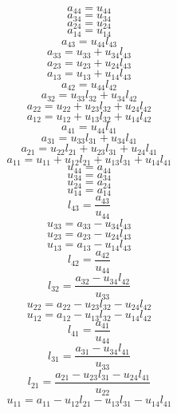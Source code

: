 \documentclass[10pt,a4paper,dvipdfmx]{article}
\begin{document}
\begin{multicols}{2}
$$ a_{{4}{4}} = u_{{4}{4}} $$
$$ a_{{3}{4}} = u_{{3}{4}} $$
$$ a_{{2}{4}} = u_{{2}{4}} $$
$$ a_{{1}{4}} = u_{{1}{4}} $$
$$ a_{{4}{3}} = u_{{4}{4}} l_{{4}{3}} $$
$$ a_{{3}{3}} = u_{{3}{3}} + u_{{3}{4}} l_{{4}{3}} $$
$$ a_{{2}{3}} = u_{{2}{3}} + u_{{2}{4}} l_{{4}{3}} $$
$$ a_{{1}{3}} = u_{{1}{3}} + u_{{1}{4}} l_{{4}{3}} $$
$$ a_{{4}{2}} = u_{{4}{4}} l_{{4}{2}} $$
$$ a_{{3}{2}} = u_{{3}{3}} l_{{3}{2}} + u_{{3}{4}} l_{{4}{2}} $$
$$ a_{{2}{2}} = u_{{2}{2}} + u_{{2}{3}} l_{{3}{2}} + u_{{2}{4}} l_{{4}{2}} $$
$$ a_{{1}{2}} = u_{{1}{2}} + u_{{1}{3}} l_{{3}{2}} + u_{{1}{4}} l_{{4}{2}} $$
$$ a_{{4}{1}} = u_{{4}{4}} l_{{4}{1}} $$
$$ a_{{3}{1}} = u_{{3}{3}} l_{{3}{1}} + u_{{3}{4}} l_{{4}{1}} $$
$$ a_{{2}{1}} = u_{{2}{2}} l_{{2}{1}} + u_{{2}{3}} l_{{3}{1}} + u_{{2}{4}} l_{{4}{1}} $$
$$ a_{{1}{1}} = u_{{1}{1}} + u_{{1}{2}} l_{{2}{1}} + u_{{1}{3}} l_{{3}{1}} + u_{{1}{4}} l_{{4}{1}} $$
\vfill\null
\columnbreak
$$ u_{{4}{4}} = a_{{4}{4}} $$
$$ u_{{3}{4}} = a_{{3}{4}} $$
$$ u_{{2}{4}} = a_{{2}{4}} $$
$$ u_{{1}{4}} = a_{{1}{4}} $$
$$ l_{{4}{3}} = \dfrac{a_{{4}{3}}}{u_{{4}{4}}} $$
$$ u_{{3}{3}} = a_{{3}{3}}- u_{{3}{4}} l_{{4}{3}} $$
$$ u_{{2}{3}} = a_{{2}{3}}- u_{{2}{4}} l_{{4}{3}} $$
$$ u_{{1}{3}} = a_{{1}{3}}- u_{{1}{4}} l_{{4}{3}} $$
$$ l_{{4}{2}} = \dfrac{a_{{4}{2}}}{u_{{4}{4}}} $$
$$ l_{{3}{2}} = \dfrac{a_{{3}{2}}- u_{{3}{4}} l_{{4}{2}}}{u_{{3}{3}}} $$
$$ u_{{2}{2}} = a_{{2}{2}}- u_{{2}{3}} l_{{3}{2}}- u_{{2}{4}} l_{{4}{2}} $$
$$ u_{{1}{2}} = a_{{1}{2}}- u_{{1}{3}} l_{{3}{2}}- u_{{1}{4}} l_{{4}{2}} $$
$$ l_{{4}{1}} = \dfrac{a_{{4}{1}}}{u_{{4}{4}}} $$
$$ l_{{3}{1}} = \dfrac{a_{{3}{1}}- u_{{3}{4}} l_{{4}{1}}}{u_{{3}{3}}} $$
$$ l_{{2}{1}} = \dfrac{a_{{2}{1}}- u_{{2}{3}} l_{{3}{1}}- u_{{2}{4}} l_{{4}{1}}}{u_{{2}{2}}} $$
$$ u_{{1}{1}} = a_{{1}{1}}- u_{{1}{2}} l_{{2}{1}}- u_{{1}{3}} l_{{3}{1}}- u_{{1}{4}} l_{{4}{1}} $$
\end{multicols}
\end{document}
